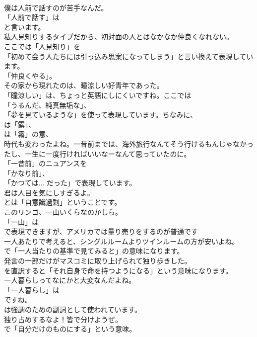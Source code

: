 \documentclass[8pt]{extreport}
\begin{document}
\begin{CJK}{UTF8}{min}
\\	僕は人前で話すのが苦手なんだ。 
\\	「人前で話す」は
\\	と言います。	
\\	私人見知りするタイプだから、初対面の人とはなかなか仲良くなれない。 
\\	ここでは「人見知り」を
\\	「初めて会う人たちには引っ込み思案になってしまう」と言い換えて表現しています。
\\	「仲良くやる」。	
\\	その家から現れたのは、瞳涼しい好青年であった。 
\\	「瞳涼しい」は、ちょっと英語にしにくいですね。ここでは
\\	「うるんだ、純真無垢な」、
\\	「夢を見ているような」を使って表現しています。ちなみに、
\\	は「露」、
\\	は「霧」の意、	
\\	時代も変わったよね。一昔前までは、海外旅行なんてそう行けるもんじゃなかったし、一生に一度行ければいいなーなんて思っていたのに。 
\\	「一昔前」のニュアンスを
\\	「かなり前」、
\\	「かつては... だった」で表現しています。	
\\	君は人目を気にしすぎるよ。 
\\	とは「自意識過剰」ということです。	
\\	このリンゴ、一山いくらなのかしら。 
\\	「一山」は
\\	で表現できますが、アメリカでは量り売りをするのが普通です
\\	一人あたりで考えると、シングルルームよりツインルームの方が安いよね。 
\\	で「一人当たりの基準で見てみると」の意味になります。	
\\	発言の一部だけがマスコミに取り上げられて独り歩きした。 
\\	を直訳すると「それ自身で命を持つようになる」という意味になります。	
\\	一人暮らしってなにかと大変なんだよね。 
\\	「一人暮らし」は
\\	ですね。
\\	は強調のための副詞として使われています。	
\\	独り占めするなよ！皆で分けようぜ。 
\\	で「自分だけのものにする」という意味。	

\end{CJK}
\end{document}
